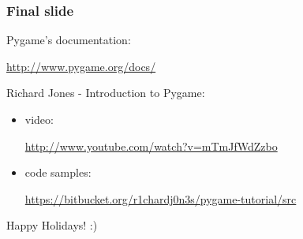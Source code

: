 \documentclass[handout]{beamer}   %
\begin{document}


\begin{frame}
\frametitle{Final slide}

Pygame's documentation: 
\begin{center}
\url{http://www.pygame.org/docs/}
\end{center}
\vspace{0.8cm}
Richard Jones - Introduction to Pygame:
\medskip
\begin{itemize}
\item[] video:
\begin{center}
\footnotesize\url{http://www.youtube.com/watch?v=mTmJfWdZzbo}
\end{center}
\item[] code samples: 
\begin{center}
\footnotesize\url{https://bitbucket.org/r1chardj0n3s/pygame-tutorial/src}
\end{center}
\end{itemize}
\vspace{0.8cm}
Happy Holidays! :)
\end{frame}


\end{document}
